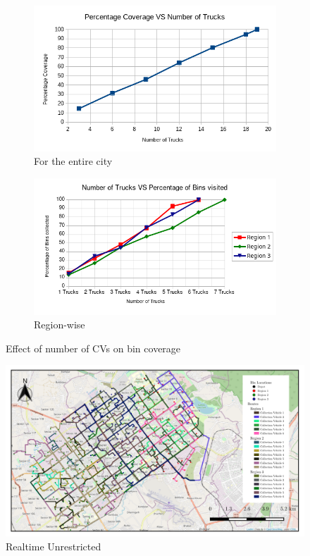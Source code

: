 \documentclass[12pt]{article}
\begin{document}
\begin{figure}[H]
    \centering
    \begin{subfigure}{0.5\textwidth}
        \centering
        \includegraphics[width=\linewidth]{coverage_VS_number_of_trucks.png}
        \caption{For the entire city}\label{figc1}
    \end{subfigure}%
    \begin{subfigure}{0.5\textwidth}
        \centering
        \includegraphics[width=\linewidth]{number_of_trucks_VS_bins_visited.png}
        \caption{Region-wise}\label{figc2}
    \end{subfigure}
    \caption{Effect of number of CVs on bin coverage}
    \label{fig3}
\end{figure}

 
\begin{figure}[H]
    \centering
    \includegraphics[scale=1.5]{Dynamic_weighted_unrestricted.png} %
    \caption{Realtime Unrestricted}\label{fig2}
\end{figure}
\end{document}
